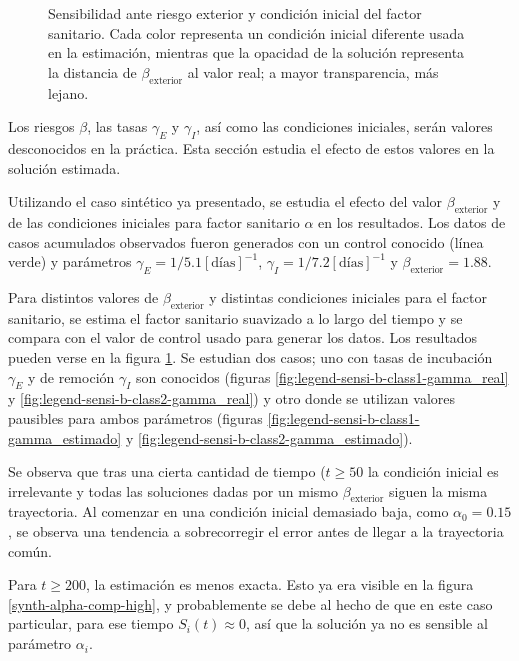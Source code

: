 \begin{figure}[H]
\caption[Sensibilidad ante riesgo exterior y condición inicial del factor sanitario.]{Sensibilidad ante riesgo exterior y condición inicial del factor sanitario. Cada color representa un condición inicial diferente usada en la estimación, mientras que la opacidad de la solución representa la distancia de \(\beta_{\text{exterior}}\) al valor real; a mayor transparencia, más lejano.} \label{fig:legend-sensi-b}
\end{figure}

Los riesgos \(\beta \), las tasas \(\gamma_E\) y \(\gamma_I\), así como las condiciones iniciales, serán valores desconocidos en la práctica. Esta sección estudia el efecto de estos valores en la solución estimada. 

Utilizando el caso sintético ya presentado, se estudia el efecto del valor \(\beta_{\text{exterior}}\) y de las condiciones iniciales para factor sanitario \(\alpha\) en los resultados. Los datos de casos acumulados observados fueron generados con un control conocido (línea verde) y parámetros \(\gamma_E = 1/5.1 [\text{días}]^{-1}\), \(\gamma_I = 1/7.2 [\text{días}]^{-1}\) y \(\beta_{\text{exterior}} = 1.88\).

Para distintos valores de \(\beta_{\text{exterior}}\) y distintas condiciones iniciales para el factor sanitario, se estima el factor sanitario suavizado a lo largo del tiempo y se compara con el valor de control usado para generar los datos. Los resultados pueden verse en la figura \ref{fig:legend-sensi-b}. Se estudian dos casos; uno con tasas de incubación \(\gamma_E\) y de remoción \(\gamma_I\) son conocidos (figuras \ref{fig:legend-sensi-b-class1-gamma_real} y \ref{fig:legend-sensi-b-class2-gamma_real}) y otro donde se utilizan valores pausibles para ambos parámetros (figuras \ref{fig:legend-sensi-b-class1-gamma_estimado} y \ref{fig:legend-sensi-b-class2-gamma_estimado}).

Se observa que tras una cierta cantidad de tiempo (\(t \geq 50\) la condición inicial es irrelevante y todas las soluciones dadas por un mismo \(\beta_{\text{exterior}}\) siguen la misma trayectoria. Al comenzar en una condición inicial demasiado baja, como \(\alpha_0 = 0.15\), se observa una tendencia a sobrecorregir el error antes de llegar a la trayectoria común. 

Para \(t \geq 200\), la estimación es menos exacta. Esto ya era visible en la figura \ref{synth-alpha-comp-high}, y probablemente se debe al hecho de que en este caso particular, para ese tiempo \(S_i(t) \approx 0\), así que la solución ya no es sensible al parámetro \(\alpha_i\).

